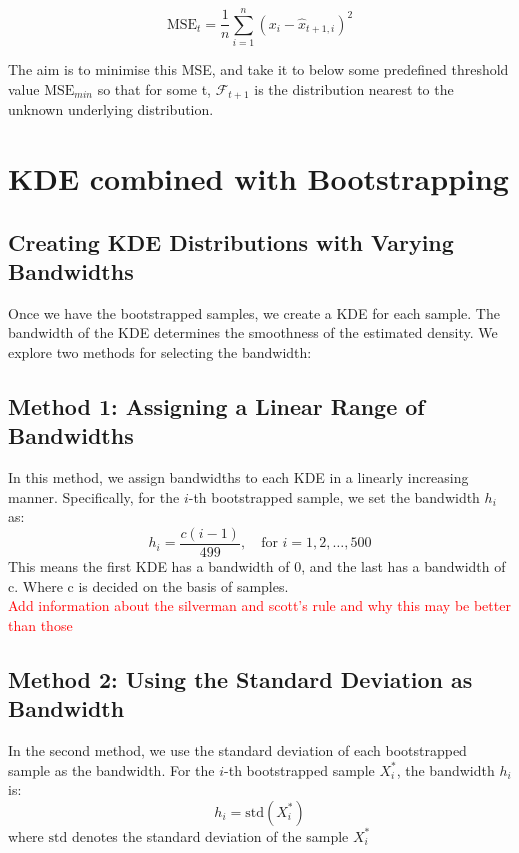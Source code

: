 \documentclass[conference]{IEEEtran}
\begin{document}
\begin{subequations}
    \begin{equation}
    \text{MSE}_{t} = \frac{1}{n} \sum_{i=1}^{n} (x_i - \hat{x}_{t+1, i})^2
    \end{equation}
\end{subequations}

The aim is to minimise this MSE, and take it to below some predefined threshold value $\text{MSE}_{min}$ so that for some t, $\mathcal{F}_{t+1}$ is the distribution nearest to the unknown underlying distribution. 



\section{KDE combined with Bootstrapping}


\subsection{Creating KDE Distributions with Varying Bandwidths}
Once we have the bootstrapped samples, we create a KDE for each sample. The bandwidth of the KDE determines the smoothness of the estimated density. We explore two methods for selecting the bandwidth:

\subsection{Method 1: Assigning a Linear Range of Bandwidths}
In this method, we assign bandwidths to each KDE in a linearly increasing manner. Specifically, for the \( i \)-th bootstrapped sample, we set the bandwidth \( h_i \) as:
\[
h_i = \frac{c(i - 1)}{499}, \quad \text{for } i = 1, 2, \ldots, 500
\]
This means the first KDE has a bandwidth of 0, and the last has a bandwidth of c. Where c is decided on the basis of samples. \\
\textcolor{red}{Add information about the silverman and scott's rule and why this may be better than those}

\subsection{Method 2: Using the Standard Deviation as Bandwidth}
In the second method, we use the standard deviation of each bootstrapped sample as the bandwidth. For the \( i \)-th bootstrapped sample \( X_i^* \), the bandwidth \( h_i \) is:
\[
h_i = \text{std}(X_i^*)
\]
where \( \text{std} \) denotes the standard deviation of the sample \(X_i^*\)
\end{document}
